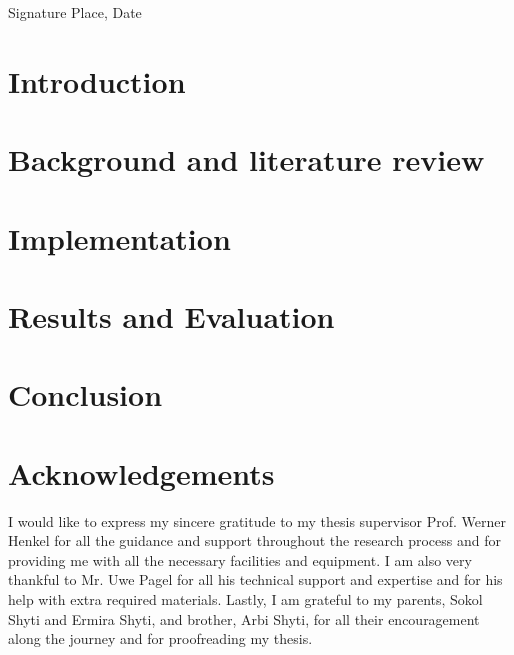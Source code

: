 \documentclass[a4paper,11pt,oneside]{article}
\begin{document}
  \vspace{20mm}

  Signature \hfill Place, Date

  \newpage
  \begin{abstract}
 
  
  \end{abstract}

  \newpage
  \tableofcontents

  \clearpage


  \newpage
  \listoffigures
  \newpage

  
  \section{Introduction}


  \newpage

  \section{Background and literature review}
  
  \section{Implementation}
  \section{Results and Evaluation}
  
  
  \section{Conclusion}


  \newpage

  \section*{Acknowledgements}
  
  I would like to express my sincere gratitude to my thesis supervisor Prof. Werner Henkel for all the guidance and support throughout the research process and for providing me with all the necessary facilities and equipment. I am also very thankful to Mr. Uwe Pagel for all his technical support and expertise and for his help with extra required materials. Lastly, I am grateful to my parents, Sokol Shyti and Ermira Shyti, and brother, Arbi Shyti, for all their encouragement along the journey and for proofreading my thesis.  

  \newpage
  
  
\end{document}
